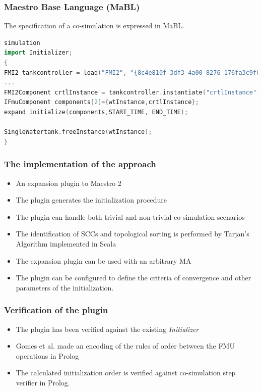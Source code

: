 \documentclass{beamer}
\begin{document}
\begin{frame}[fragile]
\frametitle{Maestro Base Language (MaBL)}
The specification of a co-simulation is expressed in MaBL.

\begin{lstlisting}[language=C++]
simulation
import Initializer;
{
FMI2 tankcontroller = load("FMI2", "{8c4e810f-3df3-4a00-8276-176fa3c9f000}", "src/test/resources/watertankcontroller-c.fmu");
...
FMI2Component crtlInstance = tankcontroller.instantiate("crtlInstance", false, false);;
IFmuComponent components[2]={wtInstance,crtlInstance};
expand initialize(components,START_TIME, END_TIME);

SingleWatertank.freeInstance(wtInstance);
}
\end{lstlisting}
\end{frame}


\begin{frame}
\frametitle{The implementation of the approach}
\begin{itemize}
    \item An expansion plugin to Maestro 2
    \item The plugin generates the initialization procedure
    \item The plugin can handle both trivial and non-trivial co-simulation scenarios
    \item The identification of SCCs and topological sorting is performed by Tarjan's Algorithm implemented in Scala
    \item The expansion plugin can be used with an arbitrary MA
    \item The plugin can be configured to define the criteria of convergence and other parameters of the initialization.
\end{itemize}
\end{frame}



\begin{frame}
\frametitle{Verification of the plugin}
\begin{itemize}
    \item The plugin has been verified against the existing \textit{Initializer}
    \item Gomes et al. made an encoding of the rules of order between the FMU operations in Prolog
    \item The calculated initialization order is verified against co-simulation step verifier in Prolog.
\end{itemize}
\end{frame}
\end{document}
